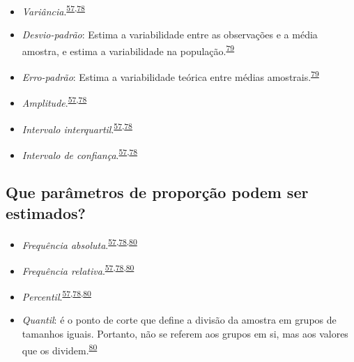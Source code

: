 \documentclass[
  a4paper,
]{book}
\begin{document}
\begin{itemize}
\item
  \emph{Variância}.\textsuperscript{\protect\hyperlink{ref-Ali2016}{57},\protect\hyperlink{ref-kanji2006}{78}}
\item
  \emph{Desvio-padrão}: Estima a variabilidade entre as observações e a média amostra, e estima a variabilidade na população.\textsuperscript{\protect\hyperlink{ref-Curran-Everett2008}{79}}
\item
  \emph{Erro-padrão}: Estima a variabilidade teórica entre médias amostrais.\textsuperscript{\protect\hyperlink{ref-Curran-Everett2008}{79}}
\item
  \emph{Amplitude}.\textsuperscript{\protect\hyperlink{ref-Ali2016}{57},\protect\hyperlink{ref-kanji2006}{78}}
\item
  \emph{Intervalo interquartil}.\textsuperscript{\protect\hyperlink{ref-Ali2016}{57},\protect\hyperlink{ref-kanji2006}{78}}
\item
  \emph{Intervalo de confiança}.\textsuperscript{\protect\hyperlink{ref-Ali2016}{57},\protect\hyperlink{ref-kanji2006}{78}}
\end{itemize}

\hypertarget{que-paruxe2metros-de-proporuxe7uxe3o-podem-ser-estimados}{%
\subsection{Que parâmetros de proporção podem ser estimados?}\label{que-paruxe2metros-de-proporuxe7uxe3o-podem-ser-estimados}}

\begin{itemize}
\item
  \emph{Frequência absoluta}.\textsuperscript{\protect\hyperlink{ref-Ali2016}{57},\protect\hyperlink{ref-kanji2006}{78},\protect\hyperlink{ref-Altman1994}{80}}
\item
  \emph{Frequência relativa}.\textsuperscript{\protect\hyperlink{ref-Ali2016}{57},\protect\hyperlink{ref-kanji2006}{78},\protect\hyperlink{ref-Altman1994}{80}}
\item
  \emph{Percentil}.\textsuperscript{\protect\hyperlink{ref-Ali2016}{57},\protect\hyperlink{ref-kanji2006}{78},\protect\hyperlink{ref-Altman1994}{80}}
\item
  \emph{Quantil}: é o ponto de corte que define a divisão da amostra em grupos de tamanhos iguais. Portanto, não se referem aos grupos em si, mas aos valores que os dividem.\textsuperscript{\protect\hyperlink{ref-Altman1994}{80}}
\end{itemize}
\end{document}

